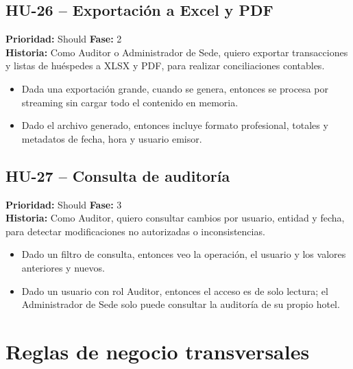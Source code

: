 \documentclass[12pt,a4paper]{article}
\newcommand{\HU}[5]{%
  \subsection*{#1 -- #2}
  \noindent\textbf{Prioridad:} #3 \hfill \textbf{Fase:} #4\\
  \noindent\textbf{Historia:} #5
  \vspace{2mm}
}
\begin{document}
\HU{HU-26}{Exportación a Excel y PDF}{Should}{2}{Como Auditor o Administrador de Sede, quiero exportar transacciones y listas de huéspedes a XLSX y PDF, para realizar conciliaciones contables.}
\begin{itemize}
  \item Dada una exportación grande, cuando se genera, entonces se procesa por streaming sin cargar todo el contenido en memoria.
  \item Dado el archivo generado, entonces incluye formato profesional, totales y metadatos de fecha, hora y usuario emisor.
\end{itemize}

\HU{HU-27}{Consulta de auditoría}{Should}{3}{Como Auditor, quiero consultar cambios por usuario, entidad y fecha, para detectar modificaciones no autorizadas o inconsistencias.}
\begin{itemize}
  \item Dado un filtro de consulta, entonces veo la operación, el usuario y los valores anteriores y nuevos.
  \item Dado un usuario con rol Auditor, entonces el acceso es de solo lectura; el Administrador de Sede solo puede consultar la auditoría de su propio hotel.
\end{itemize}

\section{Reglas de negocio transversales}
\end{document}
